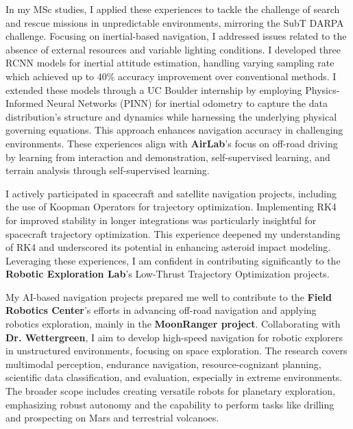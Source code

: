 \documentclass[a4,20pt]{article}
\begin{document}
\begin{large}
In my MSc studies, I applied these experiences to tackle the challenge of search and rescue missions in unpredictable environments, mirroring the SubT DARPA challenge. Focusing on inertial-based navigation, I addressed issues related to the absence of external resources and variable lighting conditions. 
I developed three RCNN models for inertial attitude estimation, handling varying sampling rate which achieved up to 40\% accuracy improvement over conventional methods. I extended these models through a UC Boulder internship by employing Physics-Informed Neural Networks (PINN) for inertial odometry to capture the data distribution's structure and dynamics while harnessing the underlying physical governing equations. This approach enhances navigation accuracy in challenging environments. These experiences align with \textbf{AirLab}'s focus on off-road driving by learning from interaction and demonstration, self-supervised learning, and terrain analysis through self-supervised learning. 


I actively participated in spacecraft and satellite navigation projects, including the use of Koopman Operators for trajectory optimization. Implementing RK4 for improved stability in longer integrations was particularly insightful for spacecraft trajectory optimization. This experience deepened my understanding of RK4 and underscored its potential in enhancing asteroid impact modeling. Leveraging these experiences, I am confident in contributing significantly to the \textbf{Robotic Exploration Lab}'s Low-Thrust Trajectory Optimization projects.

My AI-based navigation projects prepared me well to contribute to the \textbf{Field Robotics Center}'s efforts in advancing off-road navigation and applying robotics exploration, mainly in the \textbf{MoonRanger project}. Collaborating with \textbf{Dr. Wettergreen}, I aim to develop high-speed navigation for robotic explorers in unstructured environments, focusing on space exploration. The research covers multimodal perception, endurance navigation, resource-cognizant planning, scientific data classification, and evaluation, especially in extreme environments. The broader scope includes creating versatile robots for planetary exploration, emphasizing robust autonomy and the capability to perform tasks like drilling and prospecting on Mars and terrestrial volcanoes.


\end{large}
\end{document}
